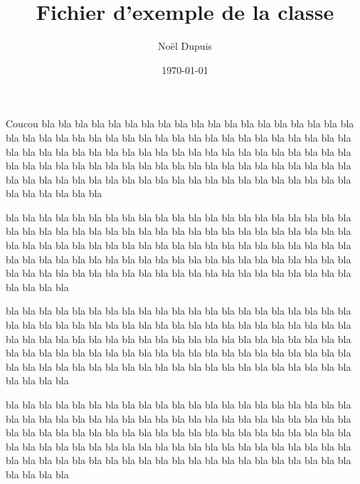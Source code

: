 \documentclass{cours}
\title{Fichier d'exemple de la classe}
\author{Noël Dupuis}
\date{\today}
\begin{document}
\maketitle

\blindtext
\begin{theoreme}{Coucou}
bla bla bla bla bla bla bla bla bla bla bla bla bla bla bla bla bla bla bla bla bla bla bla bla bla bla bla bla bla bla bla bla bla bla bla bla bla bla bla bla bla bla bla bla bla bla bla bla bla bla bla bla bla bla bla bla bla bla bla bla bla bla bla bla bla bla bla bla bla bla bla bla bla bla bla bla bla bla bla bla bla bla bla bla bla bla bla bla bla bla bla bla bla bla bla bla bla bla bla bla bla bla bla bla bla bla bla bla bla
\end{theoreme}

\blindtext
\begin{lemme}[Coucou]
bla bla bla bla bla bla bla bla bla bla bla bla bla bla bla bla bla bla bla bla bla bla bla bla bla bla bla bla bla bla bla bla bla bla bla bla bla bla bla bla bla bla bla bla bla bla bla bla bla bla bla bla bla bla bla bla bla bla bla bla bla bla bla bla bla bla bla bla bla bla bla bla bla bla bla bla bla bla bla bla bla bla bla bla bla bla bla bla bla bla bla bla bla bla bla bla bla bla bla bla bla bla bla bla bla bla bla bla bla
\end{lemme}

\begin{cor}[Coucou]
bla bla bla bla bla bla bla bla bla bla bla bla bla bla bla bla bla bla bla bla bla bla bla bla bla bla bla bla bla bla bla bla bla bla bla bla bla bla bla bla bla bla bla bla bla bla bla bla bla bla bla bla bla bla bla bla bla bla bla bla bla bla bla bla bla bla bla bla bla bla bla bla bla bla bla bla bla bla bla bla bla bla bla bla bla bla bla bla bla bla bla bla bla bla bla bla bla bla bla bla bla bla bla bla bla bla bla bla bla
\end{cor}

\begin{rem}[Coucou]
bla bla bla bla bla bla bla bla bla bla bla bla bla bla bla bla bla bla bla bla bla bla bla bla bla bla bla bla bla bla bla bla bla bla bla bla bla bla bla bla bla bla bla bla bla bla bla bla bla bla bla bla bla bla bla bla bla bla bla bla bla bla bla bla bla bla bla bla bla bla bla bla bla bla bla bla bla bla bla bla bla bla bla bla bla bla bla bla bla bla bla bla bla bla bla bla bla bla bla bla bla bla bla bla bla bla bla bla bla
\end{rem}

\end{document}
